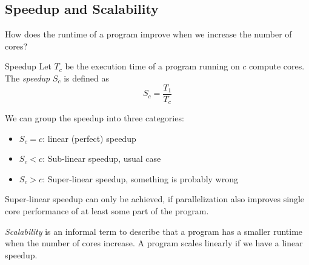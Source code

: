 \subsection{Speedup and Scalability}

How does the runtime of a program improve when we increase the number of cores?

\begin{definition}{Speedup}
    Let $T_c$ be the execution time of a program running on $c$ compute cores.
    The \emph{speedup} $S_c$ is defined as
    \begin{equation}
        S_c = \frac{T_1}{T_c}
    \end{equation}
\end{definition}

We can group the speedup into three categories:
\begin{itemize}
    \item $S_c = c$: linear (perfect) speedup
    \item $S_c < c$: Sub-linear speedup, usual case
    \item $S_c > c$: Super-linear speedup, something is probably wrong
\end{itemize}

Super-linear speedup can only be achieved, if parallelization also improves single core performance of at least some part of the program.

\emph{Scalability} is an informal term to describe that a program has a smaller runtime when the number of cores increase.
A program scales linearly if we have a linear speedup.
